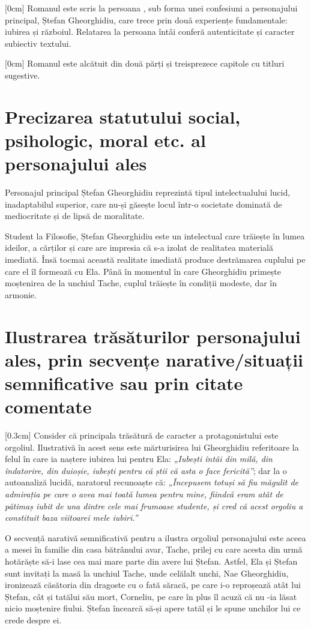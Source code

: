 \documentclass[
12pt,                        %
a4paper                      %
]{article}
\newcommand{\rom}[1]{\uppercase\expandafter{\romannumeral #1\relax}} %
\begin{document}
[0cm]
Romanul este scris la persoana \rom{1}, sub forma unei confesiuni a personajului principal, Ștefan Gheorghidiu, care trece prin două experiențe fundamentale: iubirea și războiul. Relatarea la persoana întâi conferă autenticitate și caracter subiectiv textului.

[0cm]
Romanul este alcătuit din două părți și treisprezece capitole cu titluri sugestive.

\clearpage

\section{Precizarea statutului social, psihologic, moral etc. al personajului ales}

Personajul principal Ștefan Gheorghidiu reprezintă tipul intelectualului lucid, inadaptabilul superior, care nu-și găsește locul într-o societate dominată de mediocritate și de lipsă de moralitate.

Student la Filosofie, Ștefan Gheorghidiu este un intelectual care trăiește în lumea ideilor, a cărților și care are impresia că s-a izolat de realitatea materială imediată. Însă tocmai această realitate imediată produce destrămarea cuplului pe care el îl formează cu Ela. Până în momentul în care Gheorghidiu primește moștenirea de la unchiul Tache, cuplul trăiește în condiții modeste, dar în armonie.

\section{Ilustrarea trăsăturilor personajului ales, prin secvențe na\-ra\-ti\-ve/si\-tua\-ții semnificative sau prin citate comentate}

[0.3cm]
Consider că principala trăsătură de caracter a protagonistului este orgoliul. Ilustrativă în acest sens este mărturisirea lui Gheorghidiu referitoare la felul în care ia naștere iubirea lui pentru Ela: \textit{„Iubești întâi din milă, din îndatorire, din duioșie, iubești pentru că știi că asta o face fericită”}; dar la o autoanaliză lucidă, naratorul recunoaște că: \textit{„Începusem totuși să fiu măgulit de admirația pe care o avea mai toată lumea pentru mine, fiindcă eram atât de pătimaș iubit de una dintre cele mai frumoase studente, și cred că acest orgoliu a constituit baza viitoarei mele iubiri.”}

O secvență narativă semnificativă pentru a ilustra orgoliul personajului este aceea a mesei în familie din casa bătrânului avar, Tache, prilej cu care acesta din urmă hotărăște să-i lase cea mai mare parte din avere lui Ștefan. Astfel, Ela și Ștefan sunt invitați la masă la unchiul Tache, unde celălalt unchi, Nae Gheorghidiu, ironizează căsătoria din dragoste cu o fată săracă, pe care i-o reproșează atât lui Ștefan, cât și tatălui său mort, Corneliu, pe care în plus îl acuză că nu -ia lăsat nicio moștenire fiului. Ștefan încearcă să-și apere tatăl și le spune unchilor lui ce crede despre ei.
\end{document}
